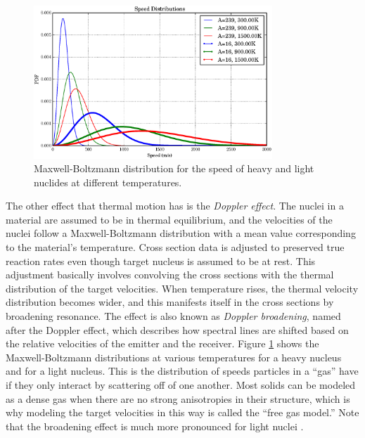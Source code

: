 \begin{figure}[h!]
  \centering
    \includegraphics[width=0.8\textwidth]{graphics/MB_dist.eps}
     \caption{Maxwell-Boltzmann distribution for the speed of heavy and light nuclides at different temperatures.   \label{MB_dist}}
\end{figure}

The other effect that thermal motion has is the \emph{Doppler effect}.  The nuclei in a material are assumed to be in thermal equilibrium, and the velocities of the nuclei follow a Maxwell-Boltzmann distribution with a mean value corresponding to the material's temperature.  Cross section data is adjusted to preserved true reaction rates even though target nucleus is assumed to be at rest.  This adjustment basically involves convolving the cross sections with the thermal distribution of the target velocities.  When temperature rises, the thermal velocity distribution becomes wider, and this manifests itself in the cross sections by broadening resonance.  The effect is also known as \emph{Doppler broadening}, named after the Doppler effect, which describes how spectral lines are shifted based on the relative velocities of the emitter and the receiver.  Figure \ref{MB_dist} shows the Maxwell-Boltzmann distributions at various temperatures for a heavy nucleus and for a light nucleus.  This is the distribution of speeds particles in a ``gas'' have if they only interact by scattering off of one another.  Most solids can be modeled as a dense gas when there are no strong anisotropies in their structure, which is why modeling the target velocities in this way is called the ``free gas model.''  Note that the broadening effect is much more pronounced for light nuclei \cite{duderstadt}.  %

